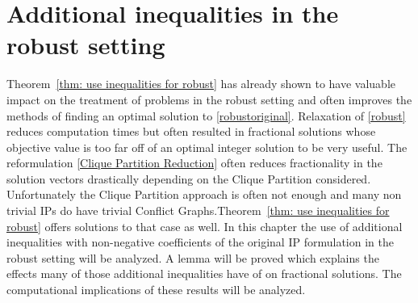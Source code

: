 \documentclass[titlepage, a4paper]{amsbook}
\theoremstyle{plain}
\theoremstyle{break}
\theoremstyle{definition}
\theoremstyle{remark}
\numberwithin{equation}{thm}
\begin{document}
\chapter{Additional inequalities in the robust setting}
Theorem~\ref{thm: use inequalities for robust} has already shown to have valuable impact on the treatment of problems in the robust setting and often improves the methods of finding an optimal solution to \eqref{robustoriginal}. Relaxation of \eqref{robust} reduces computation times but often resulted in fractional solutions whose objective value is too far off of an optimal integer solution to be very useful. The reformulation \eqref{Clique Partition Reduction} often reduces fractionality in the solution vectors drastically depending on the Clique Partition considered. Unfortunately the Clique Partition approach is often not enough and many non trivial IPs do have trivial Conflict Graphs.Theorem~\ref{thm: use inequalities for robust} offers solutions to that case as well. In this chapter the use of additional inequalities with non-negative coefficients of the original IP formulation in the robust setting will be analyzed. A lemma will be proved which explains the effects many of those additional inequalities have of on fractional solutions. The computational implications of these results will be analyzed. 
\end{document}
